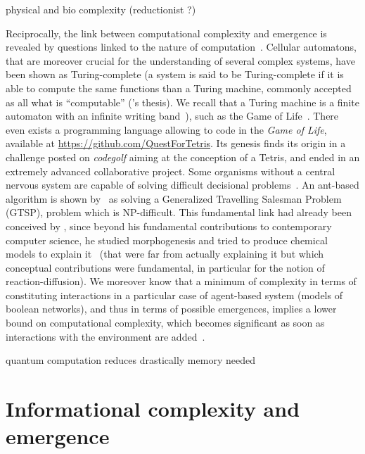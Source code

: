 \cite{WolfE8678} physical and bio complexity (reductionist ?)




Reciprocally, the link between computational complexity and emergence is revealed by questions linked to the nature of computation~\cite{moore2011nature}. Cellular automatons, that are moreover crucial for the understanding of several complex systems, have been shown as Turing-complete (a system is said to be Turing-complete if it is able to compute the same functions than a Turing machine, commonly accepted as all what is ``computable'' ('s thesis). We recall that a Turing machine is a finite automaton with an infinite writing band~\cite{moore2011nature}), such as the Game of Life~\cite{beer2004autopoiesis}. There even exists a programming language allowing to code in the \emph{Game of Life}, available at \url{https://github.com/QuestForTetris}. Its genesis finds its origin in a challenge posted on \emph{codegolf} aiming at the conception of a Tetris, and ended in an extremely advanced collaborative project. Some organisms without a central nervous system are capable of solving difficult decisional problems~\cite{reid2016decision}. An ant-based algorithm is shown by~\cite{Pintea2017} as solving a Generalized Travelling Salesman Problem (GTSP), problem which is NP-difficult. This fundamental link had already been conceived by , since beyond his fundamental contributions to contemporary computer science, he studied morphogenesis and tried to produce chemical models to explain it~\cite{turing1952chemical} (that were far from actually explaining it 
 but which conceptual contributions were fundamental, in particular for the notion of reaction-diffusion). We moreover know that a minimum of complexity in terms of constituting interactions in a particular case of agent-based system (models of boolean networks), and thus in terms of possible emergences, implies a lower bound on computational complexity, which becomes significant as soon as interactions with the environment are added~\cite{tovsic2017boolean}.



\cite{2017arXiv170404231E} quantum computation reduces drastically memory needed


\section{Informational complexity and emergence}



